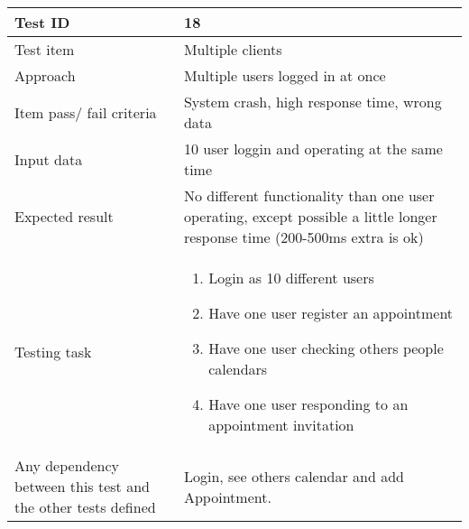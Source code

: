 \documentclass[a4paper, english, 12pt]{article}
\begin{document}
\begin{tabularx}{\textwidth}{ |X|X| }
\hline
\rowcolor{Gray}
Test ID & 18 \\ \hline
Test item & Multiple clients \\ \hline
Approach & Multiple users logged in at once\\ \hline
Item pass/ fail criteria & System crash, high response time, wrong data \\ \hline
Input data & 10 user loggin and operating at the same time\\ \hline
Expected result & 
 No different functionality than one user operating, except possible a little longer response time (200-500ms extra is ok)\\ \hline
Testing task &
\begin{enumerate}
    \item Login as 10 different users
    \item Have one user register an appointment
    \item Have one user checking others people calendars
    \item Have one user responding to an appointment invitation
\end{enumerate}\\ \hline
    
Any dependency between this test and the other tests defined & Login, see others calendar and  add Appointment.  \\ \hline

\end{tabularx}
\end{document}
